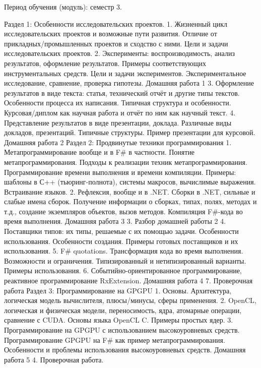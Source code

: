 Период обучения (модуль): семестр 3.

Раздел 1: Особенности исследовательских проектов.
    1. Жизненный цикл исследовательских проектов и возможные пути развития. Отличие от прикладных/промышленных проектов и сходство с ними. Цели и задачи исследовательских проектов. 
    2. Эксперименты: воспроизводимость, анализ результатов, оформление результатов. Примеры соответствующих инструментальных средств. Цели и задачи экспериментов. Экспериментальное исследование, сравнение, проверка гипотезы.
Домашняя работа 1
    3. Оформление результатов в виде текста: статья, технический отчёт и другие типы текстов. Особенности процесса их написания. Типичная структура и особенности. Курсовая/диплом как научная работа и отчёт по ним как научный текст.
    4. Представление результатов в виде презентации, доклада. Различные виды докладов, презентаций. Типичные структуры. Пример презентации для курсовой.
Домашняя работа 2
Раздел 2: Продвинутые техники программирования 
    1. Метапрограммирование вообще и в F# в частности. Понятие метапрограммирования. Подходы к реализации техник метапрограммирования.  Программирование времени выполнения и времени компиляции. Примеры: шаблоны в С++ (тьюринг-полнота), системы макросов, вычислимые выражения. Встраивание языков.
    2. Рефлексия, вообще и в .NET. Сборки в .NET, сильные и слабые имена сборок. Получение информации о сборках, типах, полях, методах и т.д., создание экземпляров объектов, вызов методов. Компиляция F#-кода во время выполнения.
Домашняя работа 3
    3. Разбор домашней работы 2   
    4. Поставщики типов: их типы, решаемые с их помощью задачи. Особенности использования. Особенности создания. Примеры готовых поставщиков и их использования.
    5. F# quotations. Трансформация кода во время выполнения. Возможности и ограничения. Типизированный и нетипизированный варианты. Примеры использования.
    6. Событийно-ориентированное программирование, реактивное программирование RxExtension.
Домашняя работа 4
    7. Проверочная работа
Раздел 3: Программирование на GPGPU
    1. Основы. Архитектура, логическая модель вычислителя, плюсы/минусы, сферы применения.
    2. OpenCL, логическая и физическая модели, переносимость, ядра, атомарные операции, сравнение с CUDA. Основы языка OpenCL C. Примеры простых ядер.
    3. Программирование на GPGPU с использованием высокоуровневых средств. Программирование GPGPU на F# как пример метапрограммирования. Особенности и проблемы использования высокоуровневых средств.
Домашняя работа 5
    4. Проверочная работа.

